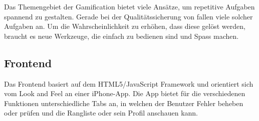 Das Themengebiet der \gls{Gamification} bietet viele Ansätze, um repetitive Aufgaben spannend zu gestalten.
Gerade bei der Qualitätssicherung von  fallen viele solcher Aufgaben an.
Um die Wahrscheinlichkeit zu erhöhen, dass diese gelöst werden, braucht es neue Werkzeuge, die einfach zu bedienen sind und Spass machen.

\subsection*{Frontend}
Das Frontend basiert auf dem HTML5/JavaScript Framework  und orientiert sich vom Look and Feel an einer iPhone-App.
Die App bietet für die verschiedenen Funktionen unterschiedliche Tabs an, in welchen der Benutzer Fehler beheben oder prüfen und die Rangliste oder sein Profil anschauen kann.

